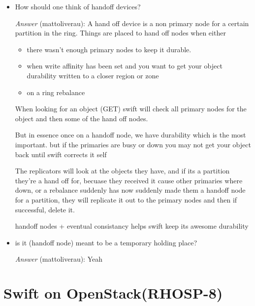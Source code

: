 \documentclass{article}
\begin{document}
\begin{itemize}
\item How should one think of handoff devices?

\emph{Answer} (mattoliverau): A hand off device is a non primary node
for a certain partition in the ring. Things are placed to hand
off nodes when either

\begin{itemize}
\item there wasn't enough primary nodes to keep it durable.
\item when write affinity has been set and you want to get your
object durability written to a closer region or zone
\item on a ring rebalance
\end{itemize}
When looking for an object (GET) swift will check all primary
nodes for the object and then some of the hand off nodes.

But in essence once on a handoff node, we have durability which
is the most important. but if the primaries are busy or down you
may not get your object back until swift corrects it self

The replicators will look at the objects they have, and if its a
partition they're a hand off for, becuase they received it cause
other primaries where down, or a rebalance suddenly has now
suddenly made them a handoff node for a partition, they will
replicate it out to the primary nodes and then if successful,
delete it.

handoff nodes + eventual consistancy helps swift keep its awesome
durability
\end{itemize}


\begin{itemize}
\item is it (handoff node) meant to be a temporary holding place?

\emph{Answer} (mattoliverau): Yeah
\end{itemize}

\section{Swift on OpenStack(RHOSP-8)}
\label{sec:org713e3c1}
\end{document}
